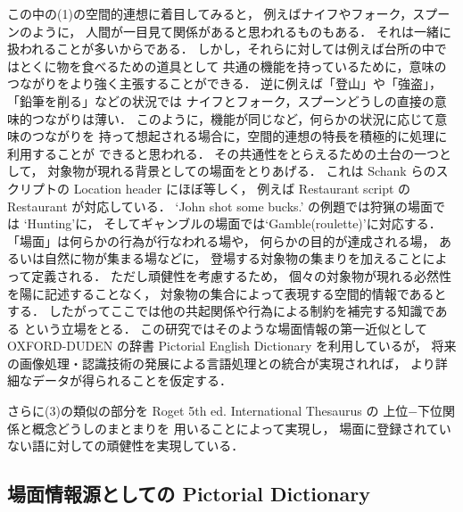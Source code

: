 この中の(1)の空間的連想に着目してみると，
例えばナイフやフォーク，スプーンのように，
人間が一目見て関係があると思われるものもある．
それは一緒に扱われることが多いからである．
しかし，それらに対しては例えば台所の中ではとくに物を食べるための道具として
共通の機能を持っているために，意味のつながりをより強く主張することができる．
逆に例えば「登山」や「強盗」，「鉛筆を削る」などの状況では
ナイフとフォーク，スプーンどうしの直接の意味的つながりは薄い．
このように，機能が同じなど，何らかの状況に応じて意味のつながりを
持って想起される場合に，空間的連想の特長を積極的に処理に利用することが
できると思われる．
その共通性をとらえるための土台の一つとして，
対象物が現れる背景としての場面をとりあげる．
これは Schank らのスクリプト\cite{Schank77}の
Location header にほぼ等しく，
例えば Restaurant script の Restaurant が対応している．
`John shot some bucks.' の例題では狩猟の場面では `Hunting'に，
そしてギャンブルの場面では`Gamble(roulette)'に対応する．
「場面」は何らかの行為が行なわれる場や，
何らかの目的が達成される場，
あるいは自然に物が集まる場などに，
登場する対象物の集まりを加えることによって定義される．
ただし頑健性を考慮するため，
個々の対象物が現れる必然性を陽に記述することなく，
対象物の集合によって表現する空間的情報であるとする．
したがってここでは他の共起関係や行為による制約を補完する知識である
という立場をとる．
この研究ではそのような場面情報の第一近似として
OXFORD-DUDEN の辞書 Pictorial English Dictionary を利用しているが，
将来の画像処理・認識技術の発展による言語処理との統合が実現されれば，
より詳細なデータが得られることを仮定する．

さらに(3)の類似の部分を Roget 5th ed. International Thesaurus の
上位−下位関係と概念どうしのまとまりを
用いることによって実現し，
場面に登録されていない語に対しての頑健性を実現している．

\subsection{場面情報源としての Pictorial Dictionary}

